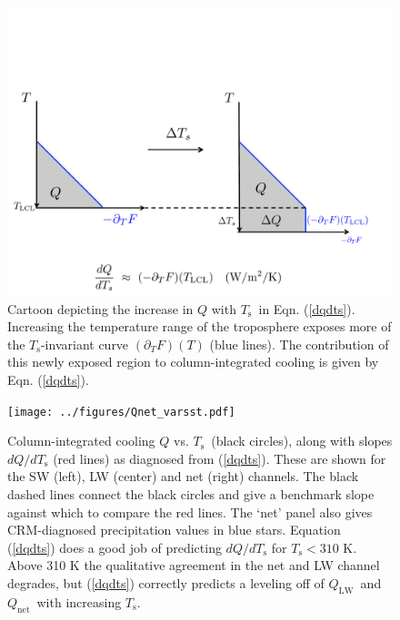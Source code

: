 \documentclass[10pt]{article}
\newcommand{\eqnref}[1]{(\ref{#1})}
\newcommand{\ppt}{\ensuremath{\partial_T}}
\newcommand{\QLW}{\ensuremath{Q_\mathrm{LW}}}
\newcommand{\Qnet}{\ensuremath{Q_\mathrm{net}}}
\newcommand{\Ts}{\ensuremath{T_\mathrm{s}}}
\begin{document}
\begin{figure}[h]
	\begin{center}
			\includegraphics[scale=0.65,trim=0cm 0cm 0cm 5cm,clip=true]{../figures/dqdts_cartoon.pdf}
		\caption{Cartoon depicting the increase in $Q$ with \Ts\ in Eqn. \eqnref{dqdts}. Increasing the temperature range of the troposphere  exposes more of the \Ts-invariant curve $(\ppt F)(T)$ (blue lines). The contribution  of this newly exposed region to column-integrated cooling is given by Eqn. \eqnref{dqdts}.
		\label{dqdts_cartoon}
		}
	\end{center}
\end{figure}


\begin{figure}[h]
	\begin{center}
			\texttt{[image: ../figures/Qnet\_varsst.pdf]}
		\caption{Column-integrated cooling $Q$ vs. \Ts\ (black circles), along with slopes $d Q/d \Ts$ (red lines) as diagnosed from \eqnref{dqdts}. These are shown for the SW (left), LW (center) and net (right) channels.  The black dashed lines connect the black circles and give a benchmark slope against which to compare the red lines. The `net' panel also gives CRM-diagnosed precipitation values in blue stars. Equation \eqnref{dqdts} does a good job of predicting $d Q/d \Ts$ for $\Ts < 310$ K. Above 310 K the qualitative agreement in the net and LW channel degrades, but \eqnref{dqdts} correctly predicts a leveling off of \QLW\ and \Qnet\ with increasing \Ts. 
		\label{Qnet_varsst}
		}
	\end{center}
\end{figure}




\end{document}

